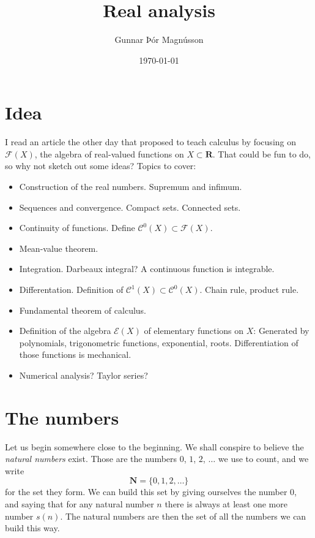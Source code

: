 \documentclass[11pt]{article}
\author{Gunnar Þór Magnússon}
\date{\today}
\title{Real analysis}
\theoremstyle{definition}
\def\CC{\mathcal{C}}
\def\EE{\mathcal{E}}
\def\FF{\mathcal{F}}
\def\NN{\mathbf{N}}
\def\RR{\mathbf{R}}
\begin{document}
\maketitle


\section{Idea}

I read an article the other day that proposed to teach calculus by focusing on
$\FF(X)$, the algebra of real-valued functions on $X \subset \RR$.
That could be fun to do, so why not sketch out some ideas?
Topics to cover:

\begin{itemize}
\item
Construction of the real numbers.
Supremum and infimum.

\item
Sequences and convergence.
Compact sets.
Connected sets.

\item
Continuity of functions. Define $\CC^0(X) \subset \FF(X)$.

\item
Mean-value theorem.

\item
Integration. Darbeaux integral? A continuous function is integrable.

\item
Differentation. Definition of $\CC^1(X) \subset \CC^0(X)$.
Chain rule, product rule.

\item
Fundamental theorem of calculus.

\item
Definition of the algebra $\EE(X)$ of elementary functions on $X$:
Generated by polynomials, trigonometric functions, exponential, roots.
Differentiation of those functions is mechanical.

\item
Numerical analysis?
Taylor series?
\end{itemize}







\section{The numbers}

Let us begin somewhere close to the beginning.
We shall conspire to believe the \emph{natural numbers} exist.
Those are the numbers $0$, $1$, $2$, $\ldots$ we use to count, and we write
\[
	\NN = \{0, 1, 2, \ldots \}
\]
for the set they form.
We can build this set by giving ourselves the number $0$, and saying that
for any natural number $n$ there is always at least one more number $s(n)$.
The natural numbers are then the set of all the numbers we can build this way.
\end{document}
